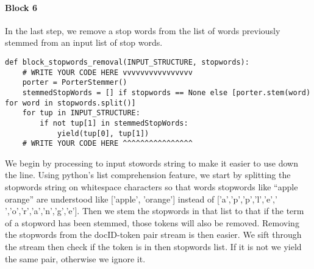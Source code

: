 \documentclass[]{report}
\begin{document}
\paragraph{Block 6}
In the last step, we remove a stop words from the list of words previously stemmed from an input list of stop words.
\begin{verbatim}
def block_stopwords_removal(INPUT_STRUCTURE, stopwords):
	# WRITE YOUR CODE HERE vvvvvvvvvvvvvvvv
	porter = PorterStemmer()
	stemmedStopWords = [] if stopwords == None else [porter.stem(word) for word in stopwords.split()]
	for tup in INPUT_STRUCTURE:
		if not tup[1] in stemmedStopWords:
			yield(tup[0], tup[1])
	# WRITE YOUR CODE HERE ^^^^^^^^^^^^^^^^
\end{verbatim}
We begin by processing to input stowords string to make it easier to use down the line. Using python's list comprehension feature, we start by splitting the stopwords string on whitespace characters so that words stopwords like ``apple orange'' are understood like ['apple', 'orange'] instead of ['a','p','p','l','e',' ','o','r','a','n','g','e']. Then we stem the stopwords in that list to that if the term of a stopword has been stemmed, those tokens will also be removed. Removing the stopwords from the docID-token pair stream is then easier. We sift through the stream then check if the token is in then stopwords list. If it is not we yield the same pair, otherwise we ignore it.
\end{document}
